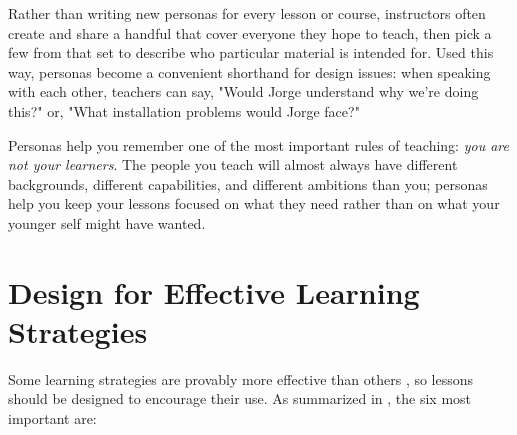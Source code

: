 \documentclass[10pt,letterpaper]{article}
\newcommand{\rulemajor}[1]{\section{#1}}
\begin{document}
Rather than writing new personas for every lesson or course, instructors often
create and share a handful that cover everyone they hope to teach, then pick a
few from that set to describe who particular material is intended for.  Used
this way, personas become a convenient shorthand for design issues: when
speaking with each other, teachers can say, "Would Jorge understand why we're
doing this?" or, "What installation problems would Jorge face?"

Personas help you remember one of the most important rules of teaching:
\emph{you are not your learners}.  The people you teach will almost always have
different backgrounds, different capabilities, and different ambitions than you;
personas help you keep your lessons focused on what they need rather than on
what your younger self might have wanted.

\rulemajor{Design for Effective Learning Strategies}

Some learning strategies are provably more effective than others
\cite{Rohr2015,Kang2016,Miya2018}, so lessons should be designed to encourage
their use.  As summarized in \cite{Wein2018a,Wein2018b}, the six most important
are:
\end{document}
